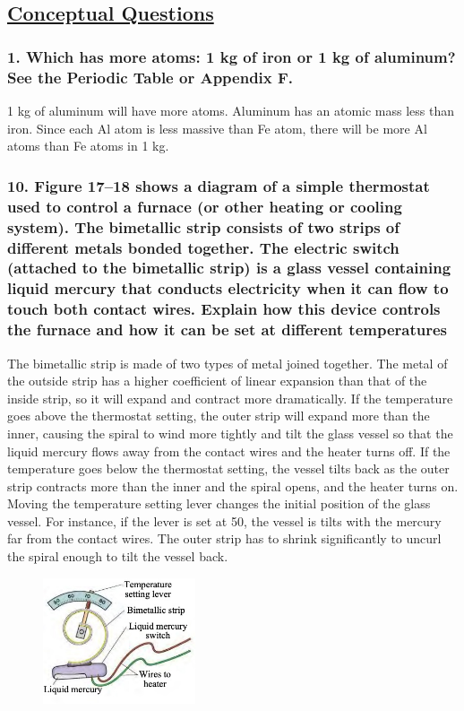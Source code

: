 \documentclass{article}
\title{
    \vspace{2in}
    \textmd{\textbf{\hmwkTitle}}\\
    \vspace{0.5in}
    \textmd{\textbf{\hmwkClass}}\\
    \vspace{4in}
}
\author{\hmwkAuthorName}
\date{}
\begin{document}
\maketitle
\newpage
\begin{center}
    \section*{\textbf{\underline {Conceptual Questions}}}
\end{center}
\subsubsection*{
    1. Which has more atoms: 1 kg of iron or 1 kg of aluminum?
    See the Periodic Table or Appendix F. 
}
1 kg of aluminum will have more atoms. Aluminum has an atomic mass less than
iron. Since each Al atom is less massive than Fe atom, there will be more Al
atoms than Fe atoms in 1 kg.
\subsubsection*{
    10. Figure 17–18 shows a diagram of a simple \textbf{thermostat} used
    to control a furnace (or other heating or cooling system). The
    bimetallic strip consists of two strips of different metals bonded
    together. The electric switch (attached to the bimetallic strip) is
    a glass vessel containing liquid mercury that conducts electricity 
    when it can flow to touch both contact wires. Explain how this device
    controls the furnace and how it can be set at different temperatures
}
The bimetallic strip is made of two types of metal joined together. The metal of
the outside strip has a higher coefficient of linear expansion than that of the
inside strip, so it will expand and contract more dramatically. If
the temperature goes above the thermostat setting, the outer strip will expand
more than the inner, causing the spiral to wind more tightly and tilt the glass
vessel so that the liquid mercury flows away from the contact wires and the
heater turns off. If the temperature goes below the thermostat setting, the
vessel tilts back as the outer strip contracts more than the inner and the
spiral opens, and the heater turns on. Moving the temperature setting lever
changes the initial position of the glass vessel. For instance, if the lever is
set at 50, the vessel is tilts with the mercury far from the contact wires. The
outer strip has to shrink significantly to uncurl the spiral enough to tilt the
vessel back.
\begin{figure}[h]
    \begin{center}
        \includegraphics[width=0.4\textwidth]{figures/q10.jpg}
    \end{center}
\end{figure}
\end{document}
